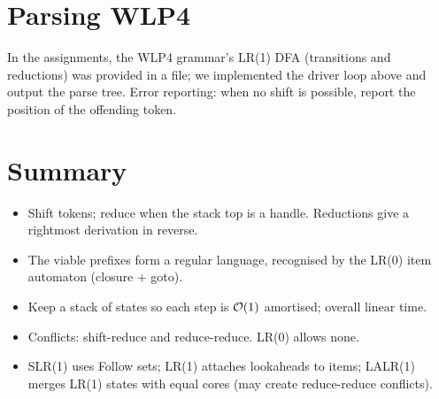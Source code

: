 \section{Parsing WLP4}

In the assignments, the WLP4 grammar's LR(1) DFA (transitions and reductions) was provided
in a file; we implemented the driver loop above and output the parse tree. Error reporting:
when no shift is possible, report the position of the offending token.

\section{Summary}
\begin{itemize}
  \item Shift tokens; reduce when the stack top is a handle. Reductions give a rightmost derivation in reverse.
  \item The viable prefixes form a regular language, recognised by the LR(0) item automaton (closure + goto).
  \item Keep a stack of states so each step is $\mathcal{O}(1)$ amortised; overall linear time.
  \item Conflicts: shift-reduce and reduce-reduce. LR(0) allows none.
  \item SLR(1) uses Follow sets; LR(1) attaches lookaheads to items; LALR(1) merges LR(1)
        states with equal cores (may create reduce-reduce conflicts).
\end{itemize}
